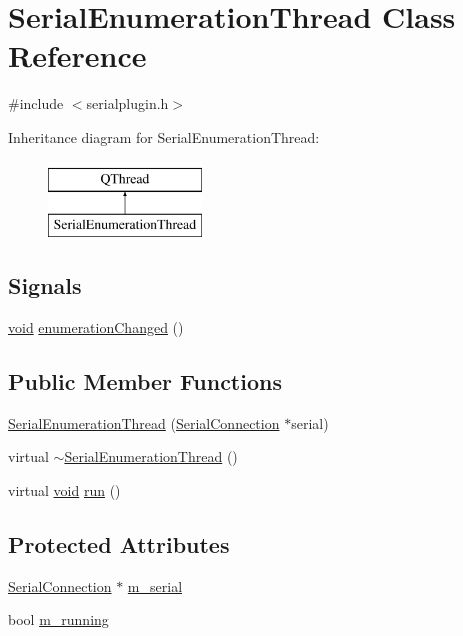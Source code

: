 \hypertarget{class_serial_enumeration_thread}{\section{Serial\-Enumeration\-Thread Class Reference}
\label{class_serial_enumeration_thread}
}


{\ttfamily \#include $<$serialplugin.\-h$>$}

Inheritance diagram for Serial\-Enumeration\-Thread\-:\begin{figure}[H]
\begin{center}
\leavevmode
\includegraphics[height=2.000000cm]{class_serial_enumeration_thread}
\end{center}
\end{figure}
\subsection*{Signals}
\begin{DoxyCompactItemize}
\item 
\hyperlink{group___u_a_v_objects_plugin_ga444cf2ff3f0ecbe028adce838d373f5c}{void} \hyperlink{group___serial_plugin_ga18ace5d92ca2899dc35a0fa3b43e016a}{enumeration\-Changed} ()
\end{DoxyCompactItemize}
\subsection*{Public Member Functions}
\begin{DoxyCompactItemize}
\item 
\hyperlink{group___serial_plugin_ga289f1853507d6f6b1bfdd1dd31284c31}{Serial\-Enumeration\-Thread} (\hyperlink{class_serial_connection}{Serial\-Connection} $\ast$serial)
\item 
virtual \hyperlink{group___serial_plugin_gaf247ad3a1a6b6c85a885aaaa1675cd48}{$\sim$\-Serial\-Enumeration\-Thread} ()
\item 
virtual \hyperlink{group___u_a_v_objects_plugin_ga444cf2ff3f0ecbe028adce838d373f5c}{void} \hyperlink{group___serial_plugin_gab90979605ec84bd0383575c2b10f18d0}{run} ()
\end{DoxyCompactItemize}
\subsection*{Protected Attributes}
\begin{DoxyCompactItemize}
\item 
\hyperlink{class_serial_connection}{Serial\-Connection} $\ast$ \hyperlink{group___serial_plugin_ga5f88185588c5c33293dad0342be60237}{m\-\_\-serial}
\item 
bool \hyperlink{group___serial_plugin_ga1b3398189b91a1994544370f00f8cd00}{m\-\_\-running}
\end{DoxyCompactItemize}


